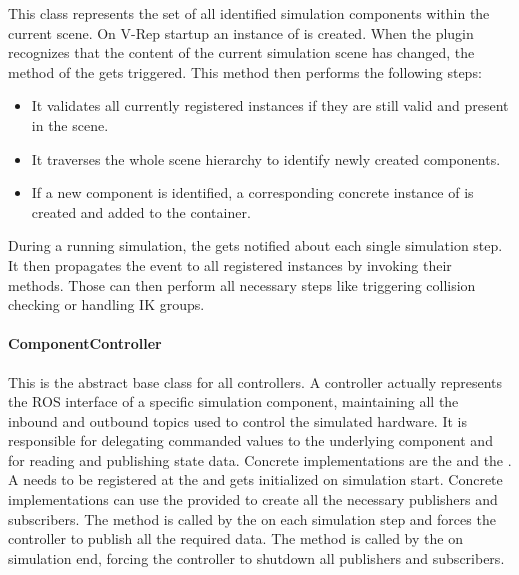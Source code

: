 This class represents the set of all identified simulation components within the current scene. On V-Rep startup an instance of  is created. When the plugin recognizes that the content of the current simulation scene has changed, the method  of the  gets triggered. This method then performs the following steps:
\begin{itemize}

\item
It validates all currently registered  instances if they are still valid and present in the scene.
\item
It traverses the whole scene hierarchy to identify newly created components.
\item
If a new component is identified, a corresponding concrete instance of  is created and added to the container.

\end{itemize}
  
During a running simulation, the  gets notified about each single simulation step. It then propagates the event to all registered  instances by invoking their  methods. Those can then perform all necessary steps like triggering collision checking or handling IK groups.

\paragraph{ComponentController}

This is the abstract base class for all controllers. A controller actually represents the ROS interface of a specific simulation component, maintaining all the inbound and outbound topics used to control the simulated hardware. It is responsible for delegating commanded values to the underlying component and for reading and publishing state data. Concrete implementations are the  and the . A  needs to be registered at the  and gets initialized on simulation start. Concrete implementations can use the provided  to create all the necessary publishers and subscribers. The  method is called by the  on each simulation step and forces the controller to publish all the required data. The  method is called by the  on simulation end, forcing the controller to shutdown all publishers and subscribers.
  
